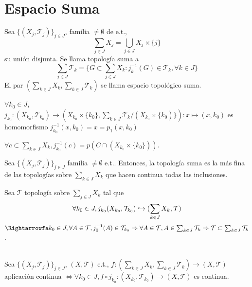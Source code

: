 \section{Espacio Suma}
\begin{defn}
  Sea $\{ ( X_{j}, \mathcal{T}_{j} ) \}_{j \in J}$, familia $\neq \emptyset$ de e.t.,
  \[
    \sum_{ j \in J } X_{j} = \bigcup_{j \in J} X_{j} \times \{ j \}
  \]
  su unión disjunta. Se llama topología suma a
  \[ 
    \sum_{ j \in J } \mathcal{T}_{k}  = \Big\{ G \subset \sum_{ j \in J } X_{k} : j_{k}^{-1}(G) \in \mathcal{T}_{k}, \forall k \in J  \Big\}
  \] 
  El par $( \sum_{k \in J} X_{k}, \sum_{k \in J} \mathcal{T}_{k})$ se llama espacio topológico suma.
\end{defn}

\begin{obs}
  $\forall k_{0} \in J$, $j_{k_{0}}: ( X_{k_{0}}, \mathcal{T}_{k_{0}} ) \to (X_{k_{0}} \times \{ k_{0} \}, \sum_{k \in J} \mathcal{T}_{k} / (X_{k_{0}} \times \{ {k_{0}}) \}) : x \mapsto (x, k_{0})$ es homomorfismo $j_{k_{0}}^{-1}(x , k_{0})= x = p_{1}(x, k_{0})$
\end{obs}

\begin{obs}
  $\forall c \subset \sum_{ k \in J } X_{k}, j_{k_{0}}^{-1}(c) = p(C \cap (X_{k_{0}} \times \{ k_{0} \}))$.
\end{obs}

\begin{prop}
  Sea $ \{ ( X_{j}, \mathcal{T}_{j} ) \}_{j \in J}$ familia $\neq \emptyset$ e.t.. Entonces, la topología suma es la más fina de las topologías sobre $\sum_{ k \in J } X_{k}$ que hacen continua todas las inclusiones.
\end{prop}

\begin{dem}
  Sea $\mathcal{T}$ topología sobre $\sum_{ j \in J } X_{k}$ tal que 
  \[ 
    \forall k_{0} \in J, j_{k_{0}}(X_{k_{0}}, \mathcal{T}_{k_{0}}) \xhookrightarrow{} ( \sum_{ k \in J } X_{k}, \mathcal{T} )
  \] 
  $\Rightarrowfa k_{0} \in J, \forall A \in \mathcal{T}, j_{0}^{-1}(A) \in \mathcal{T}_{k_{0}} \Rightarrow \forall A \in \mathcal{T}, A \in \sum_{ k \in J } \mathcal{T}_{k} \Rightarrow \mathcal{T}\subset \sum_{ k \in J } \mathcal{T}_{k}$.
\end{dem}

\begin{prop}
  \\
  
  Sea $\{ ( X_{j}, \mathcal{T}_{j} ) \}_{j \in J}$, $( X, \mathcal{T} )$ e.t., $f: ( \sum_{k \in J} X_{k}, \sum_{k \in J} \mathcal{T}_{k}) \to ( X, \mathcal{T} )$ aplicación continua $\Leftrightarrow \forall k_{0} \in J, f \circ j_{k_{0}}: ( X_{k_{0}}, \mathcal{T}_{k_{0}} ) \to ( X, \mathcal{T} )$ es continua.
\end{prop}

